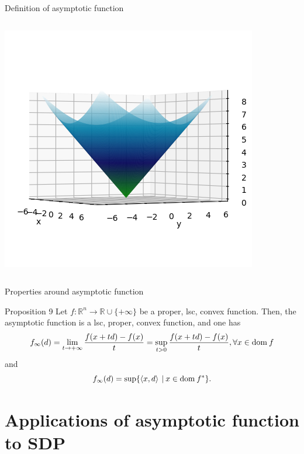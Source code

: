 \documentclass[aspectratio=169, dvipdfmx, 11pt]{beamer}
\newcommand{\RealNumberSet}{\mathbb{R}}
\newcommand{\NDemenstionalRealEuclideanSpace}{\mathbb{R}^n}
\newcommand{\Domain}[1]{\text{\rm dom\:${#1}$}} %
\newcommand{\InnerProduct}[2]{\left\langle {#1},{#2}\right\rangle} %
\newcommand{\ExtendedRealValuedFunction}[2]{{#1}: {#2} \to \RealNumberSet \cup \{+\infty\}}
\newcommand{\ConjugateFunction}[1]{{#1}^*}
\begin{document}
\begin{frame}{Definition of asymptotic function}
\begin{example}
\begin{columns}
\begin{column}{0.48\textwidth}
      \includegraphics[keepaspectratio, scale=0.5]{figures/asymptotic_function_example/asymptotic_function_example_2.png}
      \end{column}
    \end{columns}
  \end{example}
\end{frame}

\begin{frame}{Properties around asymptotic function}
  \begin{block}{Proposition 9}
    Let $\ExtendedRealValuedFunction{f}{\NDemenstionalRealEuclideanSpace}$ be a proper, lsc, convex function. Then, the asymptotic function is a lsc, proper, convex function, and one has
    \begin{equation}
      f_{\infty} (d) = \lim_{t \to +\infty} \frac{f(x+td) -f(x)}{t} = \sup_{t > 0} \frac{f(x+td) -f(x)}{t}, \forall x \in \Domain{f} \notag
    \end{equation}
    and
    \begin{equation}
      f_{\infty} (d) = \sup \{\InnerProduct{x}{d} \:|\: x \in \Domain{\ConjugateFunction{f}}\}. \notag
    \end{equation}
  \end{block}
\end{frame}

\section{Applications of asymptotic function to SDP}
\end{document}
